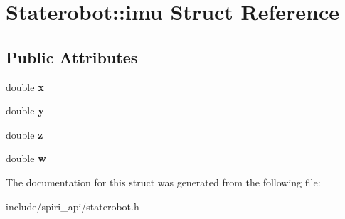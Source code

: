 \hypertarget{struct_staterobot_1_1imu}{\section{\-Staterobot\-:\-:imu \-Struct \-Reference}
\label{struct_staterobot_1_1imu}
}
\subsection*{\-Public \-Attributes}
\begin{DoxyCompactItemize}
\item 
\hypertarget{struct_staterobot_1_1imu_a2cac6fa83f9da9f1fe5fda29dc843b0a}{double {\bfseries x}}\label{struct_staterobot_1_1imu_a2cac6fa83f9da9f1fe5fda29dc843b0a}

\item 
\hypertarget{struct_staterobot_1_1imu_a604de5c50aa0920132812d2325094c2d}{double {\bfseries y}}\label{struct_staterobot_1_1imu_a604de5c50aa0920132812d2325094c2d}

\item 
\hypertarget{struct_staterobot_1_1imu_a1bccc3832c98e0598044e95ce5aa92c2}{double {\bfseries z}}\label{struct_staterobot_1_1imu_a1bccc3832c98e0598044e95ce5aa92c2}

\item 
\hypertarget{struct_staterobot_1_1imu_ae7c22b12c05dd5027469293ddff60130}{double {\bfseries w}}\label{struct_staterobot_1_1imu_ae7c22b12c05dd5027469293ddff60130}

\end{DoxyCompactItemize}


\-The documentation for this struct was generated from the following file\-:\begin{DoxyCompactItemize}
\item 
include/spiri\-\_\-api/staterobot.\-h\end{DoxyCompactItemize}
